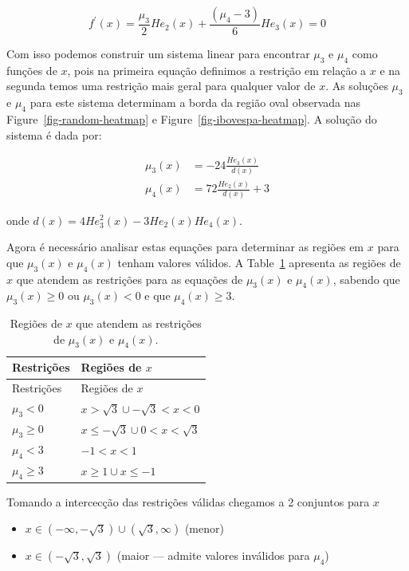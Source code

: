 \documentclass[
  letterpaper,
  DIV=11,
  numbers=noendperiod]{scrartcl}
\providecommand{\tightlist}{%
  \setlength{\itemsep}{0pt}\setlength{\parskip}{0pt}}\usepackage{longtable,booktabs,array}
\begin{document}
\[
f^\prime(x) = \frac{\mu_3}{2} He_2(x) + \frac{(\mu_4 - 3)}{6} He_3(x) = 0
\]

Com isso podemos construir um sistema linear para encontrar \(\mu_3\) e
\(\mu_4\) como funções de \(x\), pois na primeira equação definimos a
restrição em relação a \(x\) e na segunda temos uma restrição mais geral
para qualquer valor de \(x\). As soluções \(\mu_3\) e \(\mu_4\) para
este sistema determinam a borda da região oval observada nas
Figure~\ref{fig-random-heatmap} e Figure~\ref{fig-ibovespa-heatmap}. A
solução do sistema é dada por:

\[
\begin{split}
\mu_3(x) &= -24\frac{He_3(x)}{d(x)} \\
\mu_4(x) &= 72\frac{He_2(x)}{d(x)} + 3
\end{split}
\]

onde \(d(x) = 4He_3^2(x) - 3He_2(x) He_4(x)\).

Agora é necessário analisar estas equações para determinar as regiões em
\(x\) para que \(\mu_3(x)\) e \(\mu_4(x)\) tenham valores válidos. A
Table~\ref{tbl-regions} apresenta as regiões de \(x\) que atendem as
restrições para as equações de \(\mu_3(x)\) e \(\mu_4(x)\), sabendo que
\(\mu_3(x) \geq 0\) ou \(\mu_3(x) < 0\) e que \(\mu_4(x) \geq 3\).

\begin{longtable}[]{@{}ll@{}}
\caption{Regiões de \(x\) que atendem as restrições de \(\mu_3(x)\) e
\(\mu_4(x)\).}\label{tbl-regions}\tabularnewline
\toprule\noalign{}
Restrições & Regiões de \(x\) \\
\midrule\noalign{}
\endfirsthead
\toprule\noalign{}
Restrições & Regiões de \(x\) \\
\midrule\noalign{}
\endhead
\bottomrule\noalign{}
\endlastfoot
\(\mu_3 < 0\) & \(x > \sqrt{3} \cup -\sqrt{3} < x < 0\) \\
\(\mu_3 \geq 0\) & \(x \leq -\sqrt{3} \cup 0 < x < \sqrt{3}\) \\
\(\mu_4 < 3\) & \(-1 < x < 1\) \\
\(\mu_4 \geq 3\) & \(x \geq 1 \cup x \leq -1\) \\
\end{longtable}

Tomando a intercecção das restrições válidas chegamos a 2 conjuntos para
\(x\)

\begin{itemize}
\tightlist
\item
  \(x \in (-\infty, -\sqrt{3}) \cup (\sqrt{3}, \infty)\) (menor)
\item
  \(x \in (-\sqrt{3}, \sqrt{3})\) (maior --- admite valores inválidos
  para \(\mu_4\))
\end{itemize}
\end{document}
